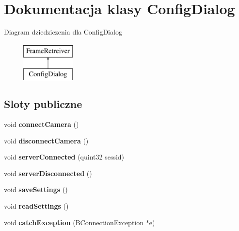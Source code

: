 \hypertarget{class_config_dialog}{
\section{Dokumentacja klasy ConfigDialog}
\label{class_config_dialog}
}
Diagram dziedziczenia dla ConfigDialog\begin{figure}[H]
\begin{center}
\leavevmode
\includegraphics[height=2cm]{class_config_dialog}
\end{center}
\end{figure}
\subsection*{Sloty publiczne}
\begin{DoxyCompactItemize}
\item 
\hypertarget{class_config_dialog_a21d23a581bbbf582c4a25d7d7204e764}{
void {\bfseries connectCamera} ()}
\label{class_config_dialog_a21d23a581bbbf582c4a25d7d7204e764}

\item 
\hypertarget{class_config_dialog_a4e9e42e4decdb4f6895f4b47d51b550e}{
void {\bfseries disconnectCamera} ()}
\label{class_config_dialog_a4e9e42e4decdb4f6895f4b47d51b550e}

\item 
\hypertarget{class_config_dialog_a5611fa4c9de2827139161cd75a7f4be6}{
void {\bfseries serverConnected} (quint32 sessid)}
\label{class_config_dialog_a5611fa4c9de2827139161cd75a7f4be6}

\item 
\hypertarget{class_config_dialog_a7782fa76c40b70438677baff0c2622f2}{
void {\bfseries serverDisconnected} ()}
\label{class_config_dialog_a7782fa76c40b70438677baff0c2622f2}

\item 
\hypertarget{class_config_dialog_adfe6884aef5e1c04ce574c6c9a1a97d9}{
void {\bfseries saveSettings} ()}
\label{class_config_dialog_adfe6884aef5e1c04ce574c6c9a1a97d9}

\item 
\hypertarget{class_config_dialog_a06d4edc9ec519809ce9104b66b15dadf}{
void {\bfseries readSettings} ()}
\label{class_config_dialog_a06d4edc9ec519809ce9104b66b15dadf}

\item 
\hypertarget{class_config_dialog_a99f28a7e313ccc20892503afdc3191b9}{
void {\bfseries catchException} (BConnectionException $\ast$e)}
\label{class_config_dialog_a99f28a7e313ccc20892503afdc3191b9}

\end{DoxyCompactItemize}
